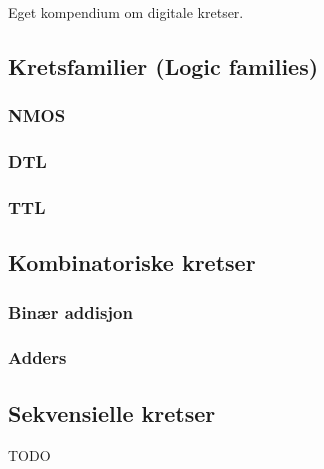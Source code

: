 Eget kompendium om digitale kretser.

\subsection{Kretsfamilier (Logic families)}
  

  \subsubsection{NMOS}
    

  \subsubsection{DTL}
    

  \subsubsection{TTL}
    

\subsection{Kombinatoriske kretser}
  

  \subsubsection{Binær addisjon}
    

  \subsubsection{Adders}
    

\subsection{Sekvensielle kretser}
  TODO
